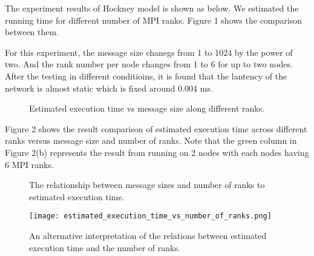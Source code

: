 The experiment results of Hockney model is shown as below. We estimated the running time for different number of MPI ranks. Figure 1 shows the comparison between them.

For this experiment, the message size chanegs from 1 to 1024 by the power of two.
And the rank number per node changes from 1 to 6 for up to two nodes.
After the testing in different conditioins, it is found that the lantency of the network is almost static which is fixed around 0.004 ms.

\begin{figure*}[h]
\centering
\hspace*{\fill}
\hspace*{\fill}
\hspace{0mm}
\hspace*{\fill}
\hspace{0mm}
\hspace*{\fill}
\caption{Estimated execution time vs message size along different ranks.}
\end{figure*}

Figure 2 shows the result comparison of estimated execution time across different ranks versus message size and number of ranks. Note that the green column in Figure 2(b) represents the result from running on 2 nodes with each nodes having 6 MPI ranks.

\begin{figure*}[h!]
\hspace{0mm}
\hspace*{\fill}
\caption{The relationship between message sizes and number of ranks to estimated execution time.}
\end{figure*}


\begin{figure}[h]
\texttt{[image: estimated\_execution\_time\_vs\_number\_of\_ranks.png]}
\caption{An alternative interpretation of the relations between estimated execution time and the number of ranks.}
\end{figure}